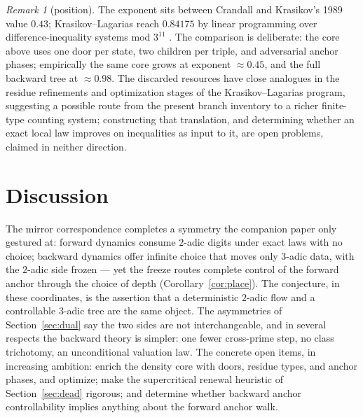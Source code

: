 \documentclass[11pt]{article}
\theoremstyle{remark}
\newtheorem{remark}[theorem]{Remark}
\begin{document}
\begin{remark}[position]
The exponent sits between Crandall \cite{crandall} and Krasikov's 1989 value $0.43$; Krasikov--Lagarias reach $0.84175$ by linear programming over difference-inequality systems mod $3^{11}$ \cite{kl}. The comparison is deliberate: the core above uses one door per state, two children per triple, and adversarial anchor phases; empirically the same core grows at exponent $\approx 0.45$, and the full backward tree at $\approx 0.98$. The discarded resources have close analogues in the residue refinements and optimization stages of the Krasikov--Lagarias program, suggesting a possible route from the present branch inventory to a richer finite-type counting system; constructing that translation, and determining whether an exact local law improves on inequalities as input to it, are open problems, claimed in neither direction.
\end{remark}

\section{Discussion}

The mirror correspondence completes a symmetry the companion paper only gestured at: forward dynamics consume $2$-adic digits under exact laws with no choice; backward dynamics offer infinite choice that moves only $3$-adic data, with the $2$-adic side frozen --- yet the freeze routes complete control of the forward anchor through the choice of depth (Corollary~\ref{cor:place}). The conjecture, in these coordinates, is the assertion that a deterministic $2$-adic flow and a controllable $3$-adic tree are the same object. The asymmetries of Section~\ref{sec:dual} say the two sides are not interchangeable, and in several respects the backward theory is simpler: one fewer cross-prime step, no class trichotomy, an unconditional valuation law. The concrete open items, in increasing ambition: enrich the density core with doors, residue types, and anchor phases, and optimize; make the supercritical renewal heuristic of Section~\ref{sec:dead} rigorous; and determine whether backward anchor controllability implies anything about the forward anchor walk.

\appendix
\end{document}
